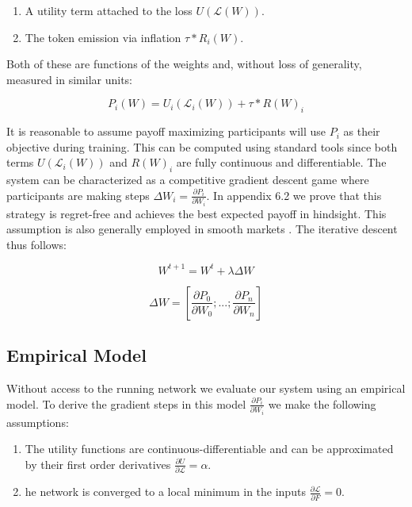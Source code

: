 \documentclass{article}
\begin{document}
\begin{enumerate}
	\item A utility term attached to the loss $U(\mathcal{L}(W))$.
	\item The token emission via inflation $\tau * R_i(W)$. 
\end{enumerate}

Both of these are functions of the weights and, without loss of generality, measured in similar units:
\bigskip

\begin{equation}
P_i (W) = U_i(\mathcal{L}_i(W)) + \tau * R(W)_i
\end{equation}
\smallskip

It is reasonable to assume payoff maximizing participants will use $P_i$ as their objective during training. This can be computed using standard tools since both terms $U(\mathcal{L}_i(W))$ and $R(W)_i$ are fully continuous and differentiable. The system can be characterized as a competitive gradient descent game where participants are making steps $\Delta W_i = \frac{\partial P_i}{\partial W_i}$. In appendix 6.2 we prove that this strategy is regret-free and achieves the best expected payoff in hindsight. This assumption is also generally employed in smooth markets \cite{balduzzi2020smooth}. The iterative descent thus follows:
\smallskip


\begin{equation}
W^{t+1} = W^{t} + \lambda \Delta W 
\end{equation}
\smallskip


\begin{equation}
\Delta W = [\frac{\partial P_0}{\partial W_0} ; ... ;\frac{\partial P_n}{\partial W_n}]
\end{equation}
\smallskip

\subsection{Empirical Model}

Without access to the running network we evaluate our system using an empirical model. To derive the gradient steps in this model $\frac{\partial P_i}{\partial W_i}$ we make the following assumptions: 

\begin{enumerate}
	\item The utility functions are continuous-differentiable and can be approximated by their first order derivatives $\frac{\partial U}{\partial \mathcal{L}} = \alpha$.
	\item  he network is converged to a local minimum in the inputs $\frac{\partial\mathcal{L}}{\partial F} = 0$.
\end{enumerate}  
\end{document}
